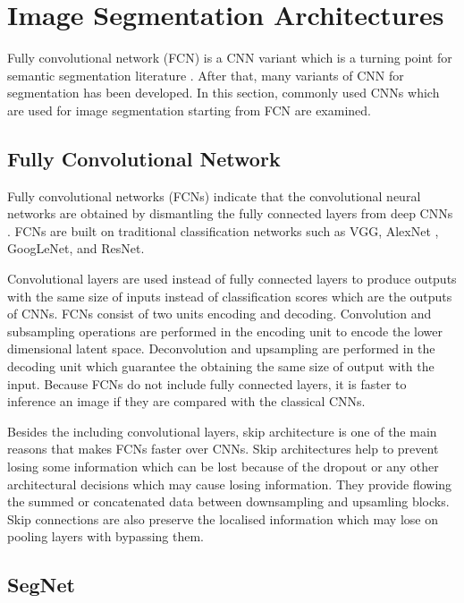 \section{Image Segmentation Architectures}

    Fully convolutional network (FCN) is a CNN variant which is a turning point for semantic segmentation literature \cite{long2015fully}.
    After that, many variants of CNN for segmentation has been developed.
    In this section, commonly used CNNs which are used for image segmentation starting from FCN are examined.

    \subsection{Fully Convolutional Network}

        Fully convolutional networks (FCNs) indicate that the convolutional neural networks are obtained by dismantling the fully connected layers from deep CNNs \cite{ulku2019survey}.
        FCNs are built on traditional classification networks such as VGG\cite{simonyan2014very}, AlexNet \cite{krizhevsky2012imagenet}, GoogLeNet\cite{szegedy2014going}, and ResNet\cite{he2016deep}.

        Convolutional layers are used instead of fully connected layers to produce outputs with the same size of inputs  instead of classification scores which are the outputs of CNNs.
        FCNs consist of two units encoding and decoding. Convolution and subsampling operations are performed in the encoding unit to encode the lower dimensional latent space.
        Deconvolution and upsampling are performed in the decoding unit which guarantee the obtaining the same size of output with the input.
        Because FCNs do not include fully connected layers, it is faster to inference an image if they are compared with the classical CNNs.

        Besides the including convolutional layers, skip architecture is one of the main reasons that makes FCNs faster over CNNs.
        Skip architectures help to prevent losing some information which can be lost because of the dropout or any other architectural decisions which may cause losing information.
        They provide flowing the summed or concatenated data between downsampling and upsamling blocks.
        Skip connections are also preserve the localised information which may lose on pooling layers with bypassing them.

    \subsection{SegNet}

